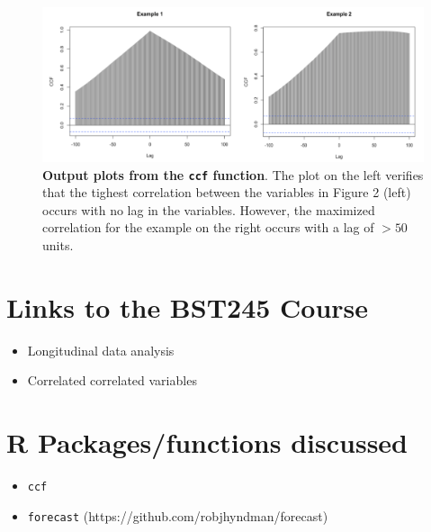 \documentclass{article}\usepackage[]{graphicx}\usepackage[]{color}
\begin{document}
\begin{figure}[ht]
    \centering
    \includegraphics[width=\textwidth]{two.png}
    \caption{\textbf{Output plots from the \texttt{ccf} function}. The plot on the left verifies that the tighest correlation between the variables in Figure 2 (left) occurs with no lag in the variables. However, the maximized correlation for the example on the right occurs with a lag of $> 50$ units.} 
    \label{fig:two}
\end{figure}

\section*{Links to the BST245 Course}
\begin{itemize}
  \item Longitudinal data analysis
  \item Correlated correlated variables
\end{itemize}

\section*{R Packages/functions discussed}
\begin{itemize}
  \item \texttt{ccf}
  \item \texttt{forecast} (https://github.com/robjhyndman/forecast)
\end{itemize}
\end{document}
